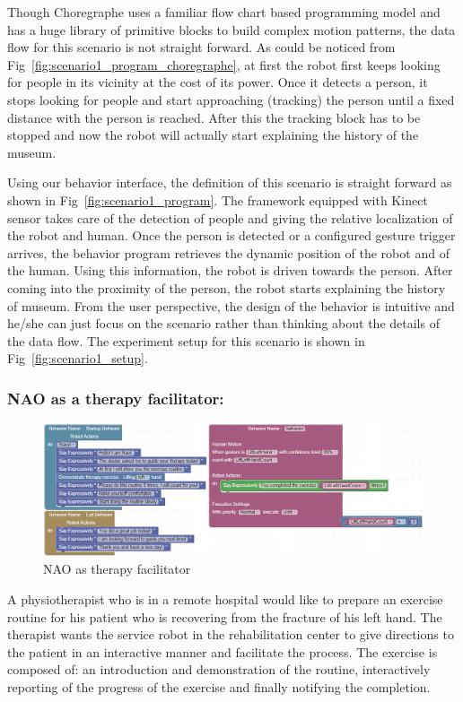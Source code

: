 \documentclass{llncs}
\begin{document}
	Though Choregraphe uses a familiar flow chart based programming model and has a huge library of primitive blocks to build complex motion patterns, the data flow for this scenario is not straight forward. As could be noticed from Fig~\ref{fig:scenario1_program_choregraphe}, at first the robot first keeps looking for people in its vicinity at the cost of its power. Once it detects a person, it stops looking for people and start approaching (tracking) the person until a fixed distance with the person is reached. After this the tracking block has to be stopped and now the robot will actually start explaining the history of the museum.
	
	Using our behavior interface, the definition of this scenario is straight forward as shown in Fig~\ref{fig:scenario1_program}. The framework equipped with Kinect sensor takes care of the detection of people and giving the relative localization of the robot and human. Once the person is detected or a configured gesture trigger arrives, the behavior program retrieves the dynamic position of the robot and of the human. Using this information, the robot is driven towards the person. After coming into the proximity of the person, the robot starts explaining the history of museum. From the user perspective, the design of the behavior is intuitive and he/she can just focus on the scenario rather than thinking about the details of the data flow. The experiment setup for this scenario is shown in Fig~\ref{fig:scenario1_setup}.
\subsubsection{NAO as a therapy facilitator:}%
\begin{figure}
\includegraphics[width=\textwidth]{../thesis/assets/scenario2_horizontal.png}
\caption[NAO as therapy facilitator]{NAO as therapy facilitator}
\label{fig:scenario2_program}
\end{figure}
	A physiotherapist who is in a remote hospital would like to prepare an exercise routine for his patient who is recovering from the fracture of his left hand. The therapist wants the service robot in the rehabilitation center to give directions to the patient in an interactive manner and facilitate the process. The exercise is composed of: an introduction and demonstration of the routine, interactively reporting of the progress of the exercise and finally notifying the completion. 
	
\end{document}
